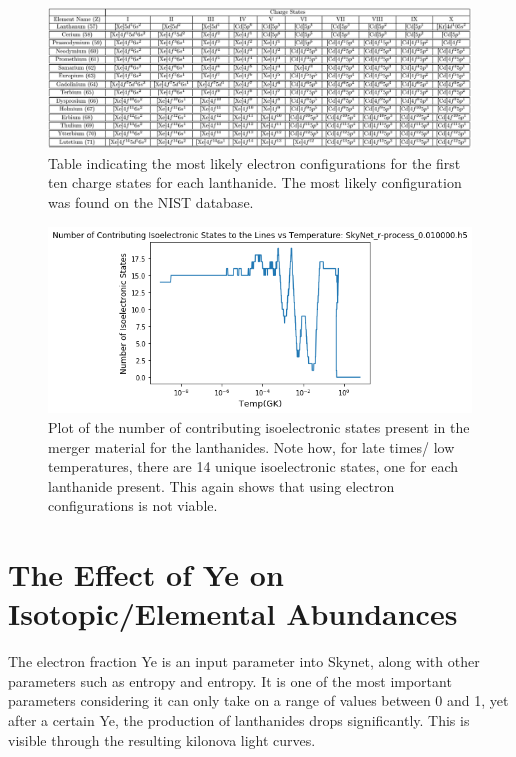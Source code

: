 \documentclass[11pt,a4paper]{article}
\begin{document}
\begin{figure}[h!]
  \includegraphics[scale = .65]{configurations.png}
  \caption{Table indicating the most likely electron configurations for the first ten charge states for each lanthanide. The most likely configuration was found on the NIST database.}
\end{figure}

\begin{figure}[h!]
  \includegraphics[scale = .6]{isoelectronic.png}
  \centering
  \caption{Plot of the number of contributing isoelectronic states present in the merger material for the lanthanides. Note how, for late times/ low temperatures, there are 14 unique isoelectronic states, one for each lanthanide present. This again shows that using electron configurations is not viable. }
\end{figure}


\section{The Effect of Ye on Isotopic/Elemental Abundances}  

The electron fraction Ye is an input parameter into Skynet, along with other parameters such as entropy and entropy. It is one of the most important parameters considering it can only take on a range of values between 0 and 1, yet after a certain Ye, the production of lanthanides drops significantly. This is visible through the resulting kilonova light curves. 
\end{document}
